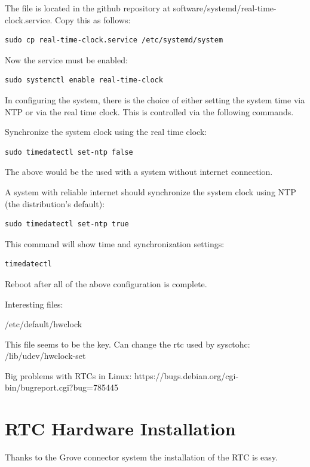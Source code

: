 The file is located in the github repository at software/systemd/real-time-clock.service.
Copy this as follows:

\begin{verbatim}
sudo cp real-time-clock.service /etc/systemd/system
\end{verbatim}

Now the service must be enabled:

\begin{verbatim}
sudo systemctl enable real-time-clock
\end{verbatim}

In configuring the system, there is the choice of either setting the system time via NTP or via the real time clock.  This is controlled via the following commands.

Synchronize the system clock using the real time clock:

\begin{verbatim}
sudo timedatectl set-ntp false
\end{verbatim}

The above would be the used with a system without internet connection.

A system with reliable internet should synchronize the system clock using NTP (the distribution's default):

\begin{verbatim}
sudo timedatectl set-ntp true
\end{verbatim}

This command will show time and synchronization settings:

\begin{verbatim}
timedatectl
\end{verbatim}

Reboot after all of the above configuration is complete.

Interesting files:

/etc/default/hwclock

This file seems to be the key.  Can change the rtc used by sysctohc:
/lib/udev/hwclock-set

Big problems with RTCs in Linux:
https://bugs.debian.org/cgi-bin/bugreport.cgi?bug=785445

\section{RTC Hardware Installation}

Thanks to the Grove connector system the installation of the RTC is easy.

